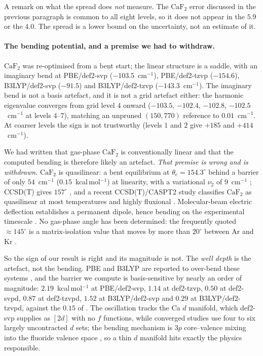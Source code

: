 A remark on what the spread does \emph{not} measure. The $\mathrm{CaF_2}$ error
discussed in the previous paragraph is common to all eight levels, so it does not
appear in the $5.9$ or the $4.0$. The spread is a lower bound on the uncertainty,
not an estimate of it.

\paragraph{The bending potential, and a premise we had to withdraw.}
$\mathrm{CaF_2}$ was re-optimised from a bent start; the linear structure is a
saddle, with an imaginary bend at PBE/def2-svp ($-103.5$~cm$^{-1}$), PBE/def2-tzvp
($-154.6$), B3LYP/def2-svp ($-91.5$) and B3LYP/def2-tzvp ($-143.3$~cm$^{-1}$). The
imaginary bend is not a basis artefact, and it is not a grid artefact either: the
harmonic eigenvalue converges from grid level $4$ onward ($-103.5$, $-102.4$,
$-102.8$, $-102.5$~cm$^{-1}$ at levels $4$--$7$), matching an unpruned $(150,770)$
reference to $0.01$~cm$^{-1}$. At coarser levels the sign is not trustworthy
(levels $1$ and $2$ give $+185$ and $+414$~cm$^{-1}$).

We had written that gas-phase $\mathrm{CaF_2}$ is conventionally linear and that
the computed bending is therefore likely an artefact. \emph{That premise is wrong
and is withdrawn.} $\mathrm{CaF_2}$ is quasilinear: a bent equilibrium at
$\theta_e = 154.3^\circ$ behind a barrier of only $54$~cm$^{-1}$
($0.15$~kcal\,mol$^{-1}$) at linearity, with a variational $\nu_2$ of
$9$~cm$^{-1}$ \citep{Koput2004}; CCSD(T) gives $157^\circ$ \citep{Vasiliu2010}, and
a recent CCSD(T)/CASPT2 study classifies $\mathrm{CaF_2}$ as quasilinear at most
temperatures and highly fluxional \citep{Romeu2025}. Molecular-beam electric
deflection establishes a permanent dipole, hence bending on the experimental
timescale \citep{Wharton1963}. No gas-phase angle has been determined: the
frequently quoted $\approx145^\circ$ is a matrix-isolation value that moves by more
than $20^\circ$ between Ar and Kr \citep{Calder1969}.

So the sign of our result is right and its magnitude is not. The \emph{well depth}
is the artefact, not the bending. PBE and B3LYP are reported to over-bend these
systems \citep{Donald2006}, and the barrier we compute is basis-sensitive by nearly
an order of magnitude: $2.19$~kcal\,mol$^{-1}$ at PBE/def2-svp, $1.14$ at
def2-tzvp, $0.50$ at def2-svpd, $0.87$ at def2-tzvpd, $1.52$ at B3LYP/def2-svp and
$0.29$ at B3LYP/def2-tzvpd, against the $0.15$ of \citet{Koput2004}. The
oscillation tracks the Ca $d$ manifold, which def2-svp supplies as $[2d]$ with no
$f$ functions, while converged studies use four to six largely uncontracted $d$
sets; the bending mechanism is $3p$ core--valence mixing into the fluoride
valence space \citep{Romeu2025}, so a thin $d$ manifold hits exactly the physics
responsible.

